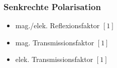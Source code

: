 

\subsubsection{Senkrechte Polarisation}
% 


\begin{itemize}
    \item mag./elek. Reflexionsfaktor $[1]$
    \item mag. Transmissionsfaktor $[1]$
    \item elek. Transmissionsfaktor $[1]$
\end{itemize}

